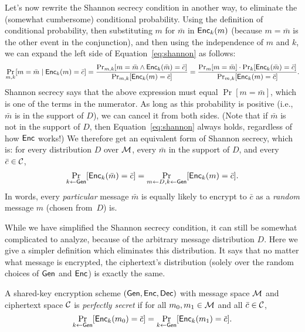 \documentclass[11pt]{article}
\begin{document}
Let's now rewrite the Shannon secrecy condition in another way, to
eliminate the (somewhat cumbersome) conditional probability.  Using
the definition of conditional probability, then substituting $m$ for
$\bar{m}$ in $\mathsf{Enc}_{k}(m)$ (because $m=\bar{m}$ is the other event
in the conjunction), and then using the independence of $m$ and $k$,
we can expand the left side of Equation~\eqref{eq:shannon} as follows:
\[ \Pr_{m,k}[m=\bar{m}\; |\; \mathsf{Enc}_{k}(m)=\bar{c}] =
\frac{\Pr_{m,k}[m = \bar{m} \wedge
  \mathsf{Enc}_{k}(\bar{m})=\bar{c}]}{\Pr_{m,k}[\mathsf{Enc}_{k}(m)=\bar{c}]} =
\frac{\Pr_{m}[m=\bar{m}] \cdot
  \Pr_{k}[\mathsf{Enc}_{k}(\bar{m})=\bar{c}]}{\Pr_{m,k}[\mathsf{Enc}_{k}(m)=\bar{c}]}. \]
Shannon secrecy says that the above expression must equal
$\Pr[m=\bar{m}]$, which is one of the terms in the numerator.  As long
as this probability is positive (i.e., $\bar{m}$ is in the support of
$D$), we can cancel it from both sides.  (Note that if $\bar{m}$ is
not in the support of $D$, then Equation~\eqref{eq:shannon} always
holds, regardless of how $\mathsf{Enc}$ works!)  We therefore get an
equivalent form of Shannon secrecy, which is: for every distribution
$D$ over $\mathcal{M}$, every $\bar{m}$ in the support of $D$, and every
$\bar{c} \in \mathcal{C}$, \[ \Pr_{k \gets
  \mathsf{Gen}}[\mathsf{Enc}_{k}(\bar{m})=\bar{c}] = \Pr_{m \gets D,k \gets
  \mathsf{Gen}}[\mathsf{Enc}_{k}(m)=\bar{c}]. \] In words, every
\emph{particular} message $\bar{m}$ is equally likely to encrypt to
$\bar{c}$ as a \emph{random} message $m$ (chosen from~$D$) is.

While we have simplified the Shannon secrecy condition, it can still
be somewhat complicated to analyze, because of the arbitrary message
distribution $D$.  Here we give a simpler definition which eliminates
this distribution.  It says that no matter what message is encrypted,
the ciphertext's distribution (solely over the random choices of
$\mathsf{Gen}$ and $\mathsf{Enc}$) is exactly the same.

\begin{definition}
  \label{def:perfect-secrecy}
  A shared-key encryption scheme $(\mathsf{Gen},\mathsf{Enc},\mathsf{Dec})$ with
  message space $\mathcal{M}$ and ciphertext space $\mathcal{C}$ is
  \emph{perfectly secret} if for all $m_{0}, m_{1} \in \mathcal{M}$ and
  all $\bar{c} \in \mathcal{C}$,
  \begin{equation}
    \label{eq:perfect}
    \Pr_{k \gets \mathsf{Gen}}[\mathsf{Enc}_{k}(m_{0}) = \bar{c}] = \Pr_{k \gets
      \mathsf{Gen}}[\mathsf{Enc}_{k}(m_{1}) = \bar{c}].
  \end{equation}
\end{definition}
\end{document}

